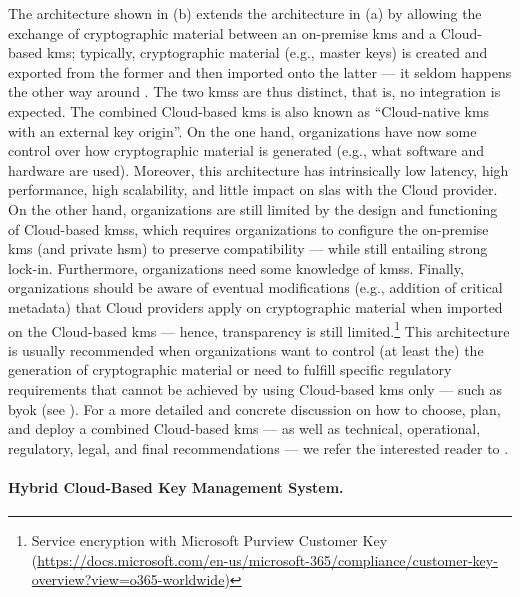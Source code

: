 The architecture shown in (b) extends the architecture in (a) by allowing the exchange of cryptographic material between an on-premise \gls{kms} and a Cloud-based \gls{kms}; typically, cryptographic material (e.g., master keys) is created and exported from the former and then imported onto the latter --- it seldom happens the other way around \cite{csa_key_2020}. The two \glspl{kms} are thus distinct, that is, no integration is expected. The combined Cloud-based \gls{kms} is also known as ``Cloud-native \gls{kms} with an external key origin''. On the one hand, organizations have now some control over how cryptographic material is generated (e.g., what software and hardware are used). Moreover, this architecture has intrinsically low latency, high performance, high scalability, and little impact on \glspl{sla} with the Cloud provider. On the other hand, organizations are still limited by the design and functioning of Cloud-based \glspl{kms}, which requires organizations to configure the on-premise \gls{kms} (and private \gls{hsm}) to preserve compatibility --- while still entailing strong lock-in. Furthermore, organizations need some knowledge of \glspl{kms}. Finally, organizations should be aware of eventual modifications (e.g., addition of critical metadata) that Cloud providers apply on cryptographic material when imported on the Cloud-based \gls{kms} \cite{csa_key_2020} --- hence, transparency is still limited.\footnote{Service encryption with Microsoft Purview Customer Key (\url{https://docs.microsoft.com/en-us/microsoft-365/compliance/customer-key-overview?view=o365-worldwide})} This architecture is usually recommended when organizations want to control (at least the) the generation of cryptographic material or need to fulfill specific regulatory requirements that cannot be achieved by using Cloud-based \gls{kms} only --- such as \gls{byok} (see ). For a more detailed and concrete discussion on how to choose, plan, and deploy a combined Cloud-based \gls{kms} --- as well as technical, operational, regulatory, legal, and final recommendations --- we refer the interested reader to \cite{csa_recommendations_2021_2}.


\paragraph*{Hybrid Cloud-Based Key Management System.}

